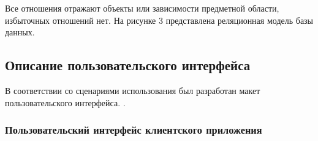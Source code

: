 \tab
Все отношения отражают объекты или зависимости предметной области, избыточных отношений нет.
На рисунке 3 представлена реляционная модель базы данных.
\picturethree

\subsection{Описание пользовательского интерфейса}

\tab
В соответствии со сценариями использования был разработан макет пользовательского интерфейса.
.

\subsubsection{Пользовательский интерфейс клиентского приложения}

